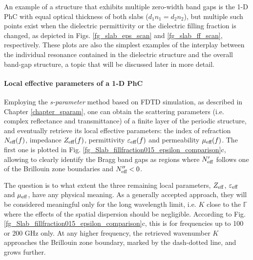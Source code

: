 An example of a structure that exhibits multiple zero-width band gaps is the 1-D PhC with equal optical thickness of both slabs ($d_1 n_1 = d_2 n_2$), but multiple such points exist when the dielectric permittivity or the dielectric filling fraction is changed, as depicted in Figs. \ref{fg_slab_eps_scan} and \ref{fg_slab_ff_scan}, respectively. These plots are also the simplest examples of the interplay between the individual resonance contained in the dielectric structure and the overall band-gap structure, a topic that will be discussed later in more detail.

\paragraph{Local effective parameters of a 1-D PhC}%
Employing the \textit{s-parameter} method based on FDTD simulation, as described in Chapter \ref{chapter_sparam}, one can obtain the scattering parameters (i.e. complex reflectance and transmittance) of a finite layer of the periodic structure, and eventually retrieve its local effective parameters: the index of refraction $N_{\text{eff} }(f)$, impedance $Z_{\text{eff} }(f)$, permittivity $\varepsilon_{\text{eff} }(f)$ and permeability $\mu_{\text{eff} }(f)$. The first one is plotted in Fig. \ref{fg_Slab_fillfraction015_epsilon_comparison}c, allowing to clearly identify the Bragg band gaps as regions where $N_{\text{eff} }'$ follows one of the Brillouin zone boundaries and $N_{\text{eff} }'' < 0$.

The question is to what extent the three remaining local parameters, $Z_{\text{eff} }$, $\varepsilon_{\text{eff} }$ and $\mu_{\text{eff} }$, have any physical meaning. As a generally accepted approach, they will be considered meaningful only for the long wavelength limit, i.e. $K$ close to the $\mathbb{\Gamma}$ where the effects of the spatial dispersion should be negligible. According to Fig. \ref{fg_Slab_fillfraction015_epsilon_comparison}c, this is for frequencies up to 100 or 200 GHz only. At any higher frequency, the retrieved wavenumber $K$ approaches the Brillouin zone boundary, marked by the dash-dotted line, and grows further.

